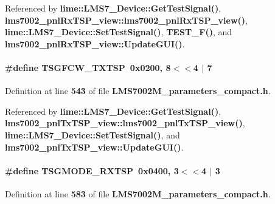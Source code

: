 Referenced by {\bf lime\+::\+L\+M\+S7\+\_\+\+Device\+::\+Get\+Test\+Signal()}, {\bf lms7002\+\_\+pnl\+Rx\+T\+S\+P\+\_\+view\+::lms7002\+\_\+pnl\+Rx\+T\+S\+P\+\_\+view()}, {\bf lime\+::\+L\+M\+S7\+\_\+\+Device\+::\+Set\+Test\+Signal()}, {\bf T\+E\+S\+T\+\_\+\+F()}, and {\bf lms7002\+\_\+pnl\+Rx\+T\+S\+P\+\_\+view\+::\+Update\+G\+U\+I()}.

\paragraph[{T\+S\+G\+F\+C\+W\+\_\+\+T\+X\+T\+SP}]{\setlength{\rightskip}{0pt plus 5cm}\#define T\+S\+G\+F\+C\+W\+\_\+\+T\+X\+T\+SP~0x0200, 8$<$$<$4 $\vert$  7}\label{LMS7002M__parameters__compact_8h_a9cb6f1aab7e16091ca44dd561488a0b8}


Definition at line {\bf 543} of file {\bf L\+M\+S7002\+M\+\_\+parameters\+\_\+compact.\+h}.



Referenced by {\bf lime\+::\+L\+M\+S7\+\_\+\+Device\+::\+Get\+Test\+Signal()}, {\bf lms7002\+\_\+pnl\+Tx\+T\+S\+P\+\_\+view\+::lms7002\+\_\+pnl\+Tx\+T\+S\+P\+\_\+view()}, {\bf lime\+::\+L\+M\+S7\+\_\+\+Device\+::\+Set\+Test\+Signal()}, and {\bf lms7002\+\_\+pnl\+Tx\+T\+S\+P\+\_\+view\+::\+Update\+G\+U\+I()}.

\paragraph[{T\+S\+G\+M\+O\+D\+E\+\_\+\+R\+X\+T\+SP}]{\setlength{\rightskip}{0pt plus 5cm}\#define T\+S\+G\+M\+O\+D\+E\+\_\+\+R\+X\+T\+SP~0x0400, 3$<$$<$4 $\vert$  3}\label{LMS7002M__parameters__compact_8h_a0f7995046f1785441e46de8d3f252f9f}


Definition at line {\bf 583} of file {\bf L\+M\+S7002\+M\+\_\+parameters\+\_\+compact.\+h}.



